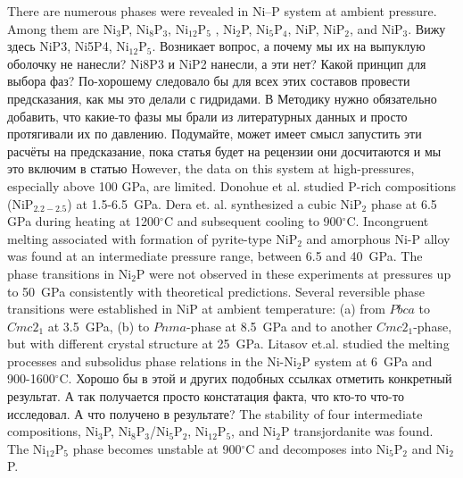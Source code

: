 \documentclass[twoside,twocolumn,9pt]{article}
\begin{document}
There are numerous phases were revealed in Ni--P system at ambient pressure. 
Among them are Ni$_3$P, Ni$_8$P$_3$, Ni$_{12}$P$_5$ , Ni$_2$P, Ni$_5$P$_4$, NiP, NiP$_2$, and NiP$_3$. 
Вижу здесь NiP3, Ni5P4, Ni$_{12}$P$_5$. Возникает вопрос, а почему мы их на выпуклую оболочку не нанесли? Ni8P3 и NiP2 нанесли, а эти нет? Какой принцип для выбора фаз? По-хорошему следовало бы для всех этих составов провести предсказания, как мы это делали с гидридами. В Методику нужно обязательно добавить, что какие-то фазы мы брали из литературных данных и просто протягивали их по давлению. Подумайте, может имеет смысл запустить эти расчёты на предсказание, пока статья будет на рецензии они досчитаются и мы это включим в статью
However, the data on this system at high-pressures, especially above 100 GPa, are limited.
Donohue et al.\cite{Donohue-1968} studied P-rich compositions (NiP$_{2.2-2.5}$) at 1.5-6.5~GPa. 
Dera et. al.\cite{Dera-2009-JGR} synthesized a cubic NiP$_2$ phase at 6.5 GPa during heating at 1200$^\circ$C and subsequent cooling to 900$^\circ$C. 
Incongruent melting associated with formation of pyrite-type NiP$_2$ and amorphous Ni-P alloy was found at an intermediate pressure range, between 6.5 and 40~GPa.
The phase transitions in Ni$_2$P were not observed in these experiments at pressures up to 50~GPa consistently with theoretical predictions.\cite{Nisar-2010-EPSL}
Several reversible phase transitions were established in NiP at ambient temperature: (a) from $Pbca$ to $Cmc2_1$ at 3.5~GPa, (b) to $Pnma$-phase at 8.5~GPa and to another $Cmc2_1$-phase, but with different crystal structure at 25~GPa.\cite{Dera-2011-JSSC, Dera2013-PCM}
{\color{red}Litasov et.al. studied the melting processes and subsolidus phase relations in the Ni-Ni$_2$P system at 6~GPa and 900-1600$^\circ$C.\cite{Litasov-2019-HPR-NiP} 
Хорошо бы в этой и других подобных ссылках отметить конкретный результат. А так получается просто констатация факта, что кто-то что-то исследовал. А что получено в результате?}
The stability of four intermediate compositions, Ni$_3$P, Ni$_8$P$_3$/Ni$_5$P$_2$, Ni$_{12}$P$_5$, and Ni$_2$P transjordanite was found. 
The Ni$_{12}$P$_5$ phase becomes unstable at 900$^\circ$C and decomposes into Ni$_5$P$_2$ and Ni$_2$P. 
\end{document}
